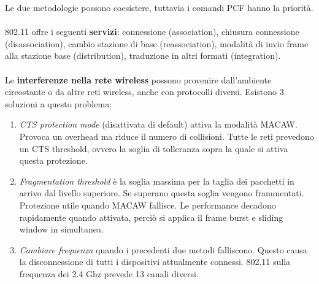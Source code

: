 \documentclass[10pt,a4paper,twoside]{article}
\begin{document}
Le due metodologie possono coesistere, tuttavia i comandi PCF hanno la priorità.\\\\
802.11 offre i seguenti \textbf{servizi}: connessione (association), chiusura connessione (disassociation), cambio stazione di base (reassociation), modalità di invio frame alla stazione base (distribution), traduzione in altri formati (integration).\\\\
Le \textbf{interferenze nella rete wireless} possono provenire dall'ambiente circostante o da altre reti wireless, anche con protocolli diversi. Esistono 3 soluzioni a questo problema:
\begin{enumerate}
\item \textit{CTS protection mode} (disattivata di default) attiva la modalità MACAW. Provoca un overhead ma riduce il numero di collisioni. Tutte le reti prevedono un CTS threshold, ovvero la soglia di tolleranza sopra la quale si attiva questa protezione.
\item \textit{Fragmentation threshold} è la soglia massima per la taglia dei pacchetti in arrivo dal livello superiore. Se superano questa soglia vengono frammentati. Protezione utile quando MACAW fallisce. Le performance decadono rapidamente quando attivata, perciò si applica il frame burst e sliding window in simultanea.
\item \textit{Cambiare frequenza} quando i precedenti due metodi falliscono. Questo causa la disconnessione di tutti i dispositivi attualmente connessi. 802.11 sulla frequenza dei 2.4 Ghz prevede 13 canali diversi.
\end{enumerate}
\end{document}
